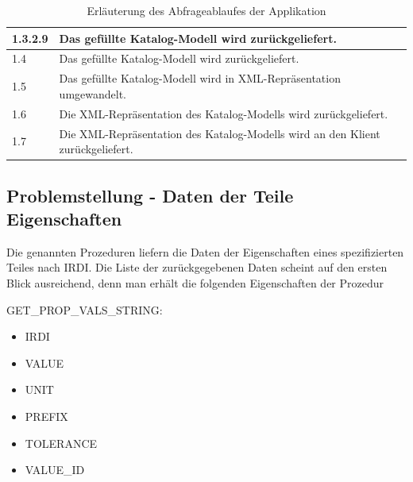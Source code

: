 \begin{table}[!hbt]
\begin{tabular}{p{3cm}p{10cm}}
1.3.2.9 &  Das gefüllte Katalog-Modell wird zurückgeliefert. \\
\hline
1.4 &  Das gefüllte Katalog-Modell wird zurückgeliefert. \\
\hline
1.5 &  Das gefüllte Katalog-Modell wird in XML-Repräsentation umgewandelt. \\
\hline
1.6 &  Die XML-Repräsentation des Katalog-Modells wird zurückgeliefert. \\
\hline
1.7 &  Die XML-Repräsentation des Katalog-Modells wird an den Klient zurückgeliefert. \\
\hline
\end{tabular}
\caption{\label{tab.abfrageablauf}Erläuterung des Abfrageablaufes der Applikation}
\vspace{2ex}\end{table}
 

\subsection{Problemstellung - Daten der Teile Eigenschaften}\label{sec:problemdateneigenschaften}

Die genannten Prozeduren liefern die Daten der Eigenschaften eines spezifizierten Teiles nach IRDI. Die Liste der zurückgegebenen Daten scheint auf den ersten Blick ausreichend, denn man erhält die folgenden Eigenschaften der Prozedur

GET\_PROP\_VALS\_STRING:

\begin{itemize}
  \item IRDI
  \item VALUE
  \item UNIT
  \item PREFIX
  \item TOLERANCE
  \item VALUE\_ID
\end{itemize}

